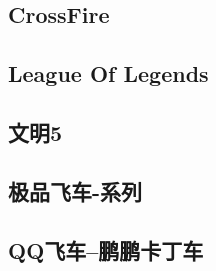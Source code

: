 \documentclass[UTF8,a4paper,8pt]{ctexart}
\begin{document}
	\subsection{CrossFire}
	
	\subsection{League Of Legends}
	
	\subsection{文明5}	
    
    \subsection{极品飞车-系列} 
     
    \subsection{QQ飞车--鹏鹏卡丁车}
    
    
    
    
\end{document}
